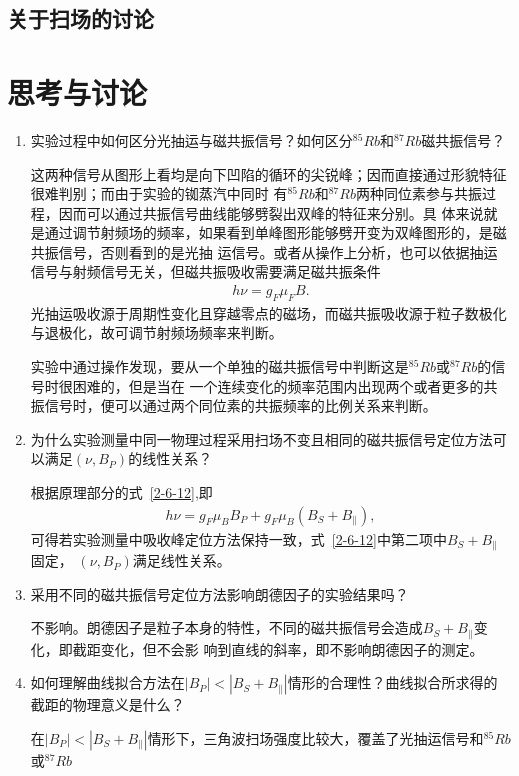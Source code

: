 \documentclass[11pt,a4paper]{article}
\begin{document}
\begin{spacing}{1.3}
\begin{CJK*}{UTF8}{gbsn}
\subsection{关于扫场的讨论}


\section{思考与讨论}
\begin{enumerate}
\item 实验过程中如何区分光抽运与磁共振信号？如何区分$^{85}Rb$和$^{87}Rb$磁共振信号？\par 
这两种信号从图形上看均是向下凹陷的循环的尖锐峰；因而直接通过形貌特征很难判别；而由于实验的铷蒸汽中同时
有$^{85}Rb$和$^{87}Rb$两种同位素参与共振过程，因而可以通过共振信号曲线能够劈裂出双峰的特征来分别。具
体来说就是通过调节射频场的频率，如果看到单峰图形能够劈开变为双峰图形的，是磁共振信号，否则看到的是光抽
运信号。或者从操作上分析，也可以依据抽运信号与射频信号无关，但磁共振吸收需要满足磁共振条件
\begin{eqnarray} 
h\nu = g_F\mu_FB.
\end{eqnarray}
光抽运吸收源于周期性变化且穿越零点的磁场，而磁共振吸收源于粒子数极化与退极化，故可调节射频场频率来判断。\par
实验中通过操作发现，要从一个单独的磁共振信号中判断这是$^{85}Rb$或$^{87}Rb$的信号时很困难的，但是当在
一个连续变化的频率范围内出现两个或者更多的共振信号时，便可以通过两个同位素的共振频率的比例关系来判断。\par 
\item 为什么实验测量中同一物理过程采用扫场不变且相同的磁共振信号定位方法可以满足$(\nu,B_P)$的线性关系？\par 
根据原理部分的式~\eqref{2-6-12},即
\begin{eqnarray} 
h\nu=g_F\mu_BB_P+g_F\mu_B(B_S+B_{\parallel}),
\end{eqnarray}
可得若实验测量中吸收峰定位方法保持一致，式~\eqref{2-6-12}中第二项中$B_S+B_{\parallel}$固定，
$(\nu,B_P)$满足线性关系。
\item  采用不同的磁共振信号定位方法影响朗德因子的实验结果吗？\par 
不影响。朗德因子是粒子本身的特性，不同的磁共振信号会造成$B_S+B_{\parallel}$变化，即截距变化，但不会影
响到直线的斜率，即不影响朗德因子的测定。
\item  如何理解曲线拟合方法在$|B_P|<|B_S+B_{\parallel}|$情形的合理性？曲线拟合所求得的截距的物理意义是什么？\par 
在$|B_P|<|B_S+B_{\parallel}|$情形下，三角波扫场强度比较大，覆盖了光抽运信号和$^{85}Rb$或$^{87}Rb$

\end{enumerate}
\end{CJK*}
\end{spacing}
\end{document}
